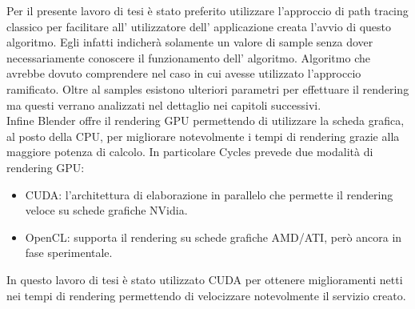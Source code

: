 Per il presente lavoro di tesi è stato preferito utilizzare l’approccio di path tracing classico per facilitare all’ utilizzatore dell’ applicazione creata l’avvio di questo algoritmo. Egli infatti indicherà solamente un valore di sample senza dover necessariamente conoscere il funzionamento dell’ algoritmo. Algoritmo che avrebbe dovuto comprendere nel caso in cui avesse utilizzato l’approccio ramificato.
Oltre al samples esistono ulteriori parametri per effettuare il rendering ma questi verrano analizzati nel dettaglio nei capitoli successivi.
\\
Infine Blender offre il rendering GPU permettendo di utilizzare la scheda grafica, al posto della CPU, per migliorare notevolmente i tempi di rendering grazie alla maggiore potenza di calcolo.
In particolare Cycles prevede due modalità di rendering GPU:
\begin{itemize}
\item CUDA: l'architettura di elaborazione in parallelo che permette il rendering veloce su schede grafiche NVidia.
\item OpenCL: supporta il rendering su schede grafiche AMD/ATI, però ancora in fase sperimentale.
\end{itemize}
In questo lavoro di tesi è stato utilizzato CUDA per ottenere miglioramenti netti nei tempi di rendering permettendo di velocizzare notevolmente il servizio creato.
